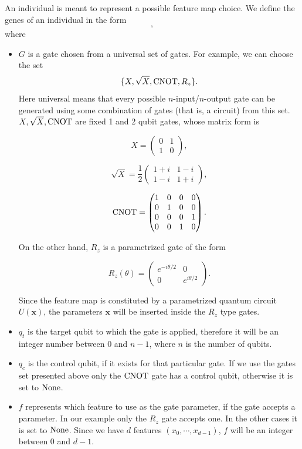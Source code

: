 \documentclass[12pt]{article}
\begin{document}
An individual is meant to represent a possible feature map choice. We define the genes of an individual in the form 
\begin{equation}
    [G, q_t, q_c, f],
\end{equation} 
where
\begin{itemize}
    \item $G$ is a gate chosen from a universal set of gates. For example, we can choose the set \begin{equation}
        \{X, \sqrt{X}, \textup{CNOT}, R_z\}.
    \end{equation}
    Here universal means that every possible $n$-input/$n$-output gate can be generated using some combination of gates (that is, a circuit) from this set. 
    $X, \sqrt{X}, \textup{CNOT}$ are fixed 1 and 2 qubit gates, whose matrix form is

\[
X = \begin{pmatrix}
0 & 1 \\
1 & 0
\end{pmatrix},
\]

\[
\sqrt{X} = \frac{1}{2} \begin{pmatrix}
1 + i & 1 - i \\
1 - i & 1 + i
\end{pmatrix},
\]

\[
\textup{CNOT} = \begin{pmatrix}
1 & 0 & 0 & 0 \\
0 & 1 & 0 & 0 \\
0 & 0 & 0 & 1 \\
0 & 0 & 1 & 0
\end{pmatrix}.
\]


On the other hand, $R_z$ is a parametrized gate of the form

\[
R_z(\theta) = \begin{pmatrix}
e^{-i\theta/2} & 0 \\
0 & e^{i\theta/2}
\end{pmatrix}.
\]

Since the feature map is constituted by a parametrized quantum circuit $U(\mathbf{x})$, the parameters $\mathbf{x}$ will be inserted inside the $R_z$ type gates. 

\item $q_t$ is the target qubit to which the gate is applied, therefore it will be an integer number between $0$ and $n-1$, where $n$ is the number of qubits. 

\item $q_c$ is the control qubit, if it exists for that particular gate. If we use the gates set presented above only the $\textup{CNOT}$ gate has a control qubit, otherwise it is set to $\textup{None}$.

\item $f$ represents which feature to use as the gate parameter, if the gate accepts a parameter. In our example only the $R_z$ gate accepts one. In the other cases it is set to $\textup{None}$. Since we have $d$ features $(x_0, \cdots, x_{d-1})$, $f$ will be an integer between $0$ and $d-1$. 
\end{itemize}
\end{document}
